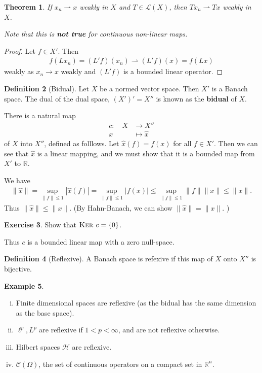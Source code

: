 \documentclass[10pt, oneside, reqno]{amsart}
\theoremstyle{plain}%
\newtheorem{thm}{Theorem}[section]
\numberwithin{equation}{section}
\theoremstyle{definition}
\newtheorem{defn}[thm]{Definition}
\newtheorem{exmp}[thm]{Example}
\newtheorem{exer}[thm]{Exercise}
\theoremstyle{remark}
\newcommand{\R}{\mathbb{R}}
\newcommand{\El}{\mathcal{L}}
\newcommand{\mapping}[5]{\begin{align*}
	#1 : \quad     #2 &\rightarrow #3 \\
			#4  &\mapsto #5
\end{align*}	
}
\renewcommand{\ker}{\textsc{Ker\ }}
\begin{document}
\begin{thm}
	If $x_n \rightharpoonup x$ weakly in $X$ and $T \in \El(X)$, then $Tx_n \rightharpoonup Tx$ weakly in $X$.  
	
	Note that this is \textbf{not true} for continuous non-linear maps. 
\end{thm}
\begin{proof}
	Let $f \in X'$.  Then \begin{align*}
		f(Lx_n) = (L'f)(x_n) \rightharpoonup (L'f)(x) = f(Lx)
	\end{align*} weakly as $x_n \rightarrow x$ weakly and $(L'f)$ is a bounded linear operator.  
\end{proof}


\begin{defn}[Bidual]
	Let $X$ be a normed vector space. Then $X'$ is a Banach space.  The dual of the dual space, $(X')' = X''$ is known as the \textbf{bidual} of $X$.  
\end{defn}


There is a natural map \mapping{c}{X}{X''}{x}{\hat x} of $X$ into $X''$, defined as folllows.  Let $\hat x(f) = f(x)$ for all $f \in X'$.  Then we can see that $\hat x$ is a linear mapping, and we must show that it is a bounded map from $X'$ to $\R$.  

We have \begin{align*}
	\| \hat x \| = \sup_{\| f \| \leq 1} |\hat x(f)| = \sup_{\| f \| \leq 1} |f(x)| \leq \sup_{\|f \| \leq 1} \| f \| \| x \| \leq \| x \|. 
\end{align*}  Thus $\| \hat x \| \leq \| x \|$.  (By Hahn-Banach, we can show $\| \hat x \| = \| x \|$. )

\begin{exer}
	Show that $\ker c = \{ 0 \}$.  
\end{exer}  

Thus $c$ is a bounded linear map with a zero null-space.

\begin{defn}[Reflexive]
	A Banach space is refexive if this map of $X$ onto $X''$ is bijective.  
\end{defn}

\begin{exmp}{\ }
	\begin{enumerate}[(i)]
		\item Finite dimensional spaces are reflexive (as the bidual has the same dimension as the base space).
		\item $\ell^p, L^p$ are reflexive if $1 < p < \infty$, and are not reflexive otherwise.
		\item Hilbert spaces $\mathcal H$ are reflexive.
		\item $\mathcal C(\Omega)$, the set of continuous operators on a compact set in $\R^n$.  
	\end{enumerate}
\end{exmp}
\end{document}
